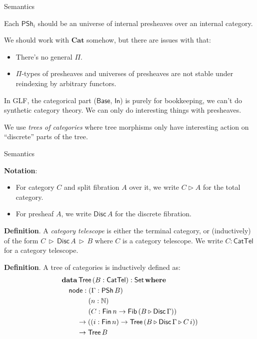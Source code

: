 \documentclass[dvipsnames,aspectratio=169]{beamer}
\newcommand{\ms}[1]{\mathsf{#1}}
\newcommand{\mbb}[1]{\mathbb{#1}}
\newcommand{\mbf}[1]{\mathbf{#1}}
\newcommand{\Set}{\mathsf{Set}}
\newcommand{\CatTel}{\mathsf{CatTel}}
\newcommand{\Fib}{\mathsf{Fib}}
\newcommand{\Fin}{\mathsf{Fin}}
\newcommand{\Tree}{\mathsf{Tree}}
\newcommand{\Disc}{\mathsf{Disc}}
\newcommand{\Base}{\mathsf{Base}}
\newcommand{\In}{\mathsf{In}}
\newcommand{\PSh}{\mathsf{PSh}}
\newcommand{\bCat}{\mathbf{Cat}}
\newcommand{\ext}{\triangleright}
\begin{document}
\begin{frame}{Semantics}

Each $\PSh_i$ should be an universe of internal presheaves over an internal category.
\vspace{1em}

We should work with $\bCat$ somehow, but there are issues with that:
\begin{itemize}
\item There's no general $\Pi$.
\item $\Pi$-types of presheaves and universes of presheaves are not stable under
      reindexing by arbitrary functors.
\end{itemize}
\vspace{1em}

In GLF, the categorical part ($\Base$, $\In$) is purely for bookkeeping, we can't do synthetic
category theory. We can only do interesting things with presheaves.
\vspace{1em}

We use \emph{trees of categories} where tree morphisms only have interesting
action on ``discrete'' parts of the tree.

\end{frame}

\begin{frame}{Semantics}

\textbf{Notation}:
\begin{itemize}
\item For category $C$ and split fibration $A$ over it, we write $C \ext A$ for the total category.
\item For presheaf $A$, we write $\Disc\,A$ for the discrete fibration.
\end{itemize}
\vspace{1em}

\textbf{Definition}. A \emph{category telescope} is either the terminal category, or (inductively)
of the form $C\,\ext\,\Disc\,A\,\ext\,B$ where $C$ is a category telescope. We write $C : \CatTel$
for a category telescope.
\vspace{1em}

\textbf{Definition}. A tree of categories is inductively defined as:
\begin{alignat*}{3}
  & \mbf{data}\,\Tree\,(B : \CatTel) : \Set\,\mbf{where}\\
  & \hspace{1em} \ms{node} : (\Gamma : \PSh\,B)\\
  & \hspace{3.8em}      (n : \mbb{N})\\
  & \hspace{3.8em}      (C : \Fin\,n \to \Fib\,(B \ext \Disc\,\Gamma))\\
  & \hspace{2.2em} \to ((i : \Fin\,n) \to \Tree\,(B \ext \Disc\,\Gamma \ext C\,i))\\
  & \hspace{2.2em} \to \Tree\,B
\end{alignat*}

\end{frame}
\end{document}
